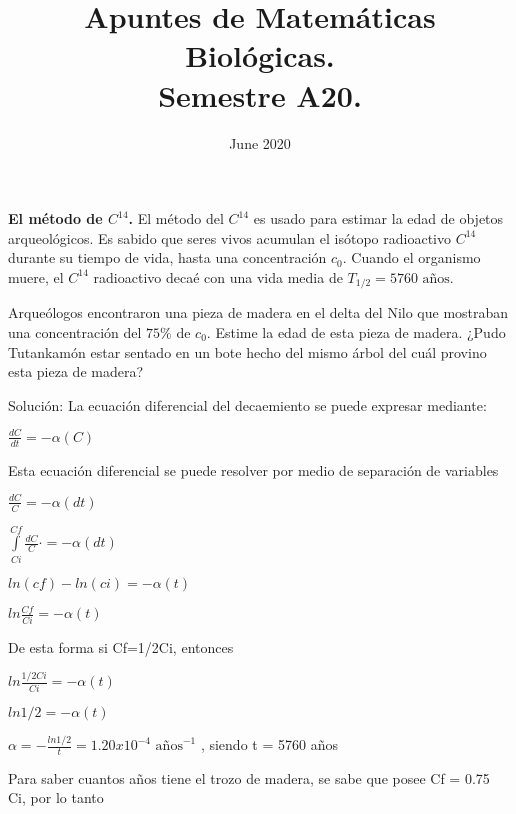 \documentclass[12 pt, letterpaper,spanish]{article}
\title{Apuntes de Matemáticas Biológicas.\\ Semestre A20.}
\author{}
\date{June 2020}
\newenvironment{exercise}[2][Ejercicio]{\begin{trivlist}
\item[\hskip \labelsep {\bfseries #1}\hskip \labelsep {\bfseries #2.}]}{\end{trivlist}}
\begin{document}
\maketitle

\begin{exercise}{3.9.1, Hillen}
\hfill \break
\textbf{El método de $C^{14}$.}
El método del $C^{14}$ es usado para estimar la edad de objetos arqueológicos.
Es sabido que seres vivos acumulan el isótopo radioactivo $C^14$ durante su tiempo de vida, hasta una concentración $c_0$.
Cuando el organismo muere, el $C^{14}$ radioactivo decaé con una vida media de $T_{1/2} = 5760 \text{ años}$.

Arqueólogos encontraron una pieza de madera en el delta del Nilo que mostraban una concentración del $75 \%$ de $c_0$.
Estime la edad de esta pieza de madera.
¿Pudo Tutankamón estar sentado en un bote hecho del mismo árbol del cuál provino esta pieza de madera?
\end{exercise}
Solución: La ecuación diferencial del decaemiento se puede expresar mediante:
   \begin{center}
        $\frac{dC}{dt} = -\alpha(C)$
    \end{center}
Esta ecuación diferencial se puede resolver por medio de separación de variables
    \begin{center}
        $\frac{dC}{C} = -\alpha(dt)$
    \end{center}
    \begin{center}
        $\int\limits_{Ci}^{Cf} \frac{dC}{C} \cdot = -\alpha(dt)$
    \end{center}
    \begin{center}
        $ln(cf)-ln(ci) = -\alpha(t) $     
    \end{center}
    \begin{center}
        $ln \frac{Cf}{Ci} = -\alpha(t) $     
    \end{center}

De esta forma si Cf=1/2Ci, entonces

    \begin{center}
        $ln \frac{1/2Ci}{Ci} = -\alpha(t) $     
    \end{center}
    
    \begin{center}
        $ln1/2 = -\alpha(t) $     
    \end{center}
    
     \begin{center}
        $\alpha =-\frac{ln 1/2}{t}= 1.20x10^{-4} \text{ años}^{-1}$ 
        , siendo t = 5760 años
    \end{center}
Para saber cuantos años tiene el trozo de madera, se sabe que posee Cf = 0.75 Ci, por lo tanto
\end{document}
